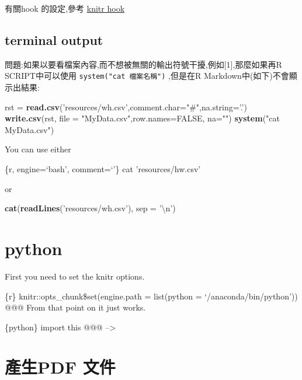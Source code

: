 \documentclass[]{book}
\newenvironment{Shaded}{\begin{snugshade}}{\end{snugshade}}
\newcommand{\KeywordTok}[1]{\textcolor[rgb]{0.13,0.29,0.53}{\textbf{#1}}}
\newcommand{\DataTypeTok}[1]{\textcolor[rgb]{0.13,0.29,0.53}{#1}}
\newcommand{\CharTok}[1]{\textcolor[rgb]{0.31,0.60,0.02}{#1}}
\newcommand{\StringTok}[1]{\textcolor[rgb]{0.31,0.60,0.02}{#1}}
\newcommand{\OtherTok}[1]{\textcolor[rgb]{0.56,0.35,0.01}{#1}}
\newcommand{\NormalTok}[1]{#1}
\theoremstyle{definition}
\theoremstyle{definition}
\theoremstyle{definition}
\theoremstyle{remark}
\begin{document}
有關hook 的設定,參考
\href{https://yihui.name/knitr/hooks/\#output-hooks}{knitr hook}

\subsection{terminal output}\label{terminal-output}

問題:如果以要看檔案內容,而不想被無關的輸出符號干擾,例如{[}1{]},那麼如果再R
SCRIPT中可以使用 \texttt{system("cat\ 檔案名稱")} ,但是在R
Markdown中(如下)不會顯示出結果:

\begin{Shaded}
\begin{Highlighting}[]
\NormalTok{rst =}\StringTok{ }\KeywordTok{read.csv}\NormalTok{(}\StringTok{'resources/wh.csv'}\NormalTok{,}\DataTypeTok{comment.char=}\StringTok{"#"}\NormalTok{,}\DataTypeTok{na.string=}\StringTok{'.'}\NormalTok{)}
\KeywordTok{write.csv}\NormalTok{(rst, }\DataTypeTok{file =} \StringTok{"MyData.csv"}\NormalTok{,}\DataTypeTok{row.names=}\OtherTok{FALSE}\NormalTok{, }\DataTypeTok{na=}\StringTok{""}\NormalTok{)}
\KeywordTok{system}\NormalTok{(}\StringTok{"cat MyData.csv"}\NormalTok{)}
\end{Highlighting}
\end{Shaded}

You can use either

\{r, engine=`bash', comment=`'\} cat 'resources/hw.csv'

or

\begin{Shaded}
\begin{Highlighting}[]
\KeywordTok{cat}\NormalTok{(}\KeywordTok{readLines}\NormalTok{(}\StringTok{'resources/wh.csv'}\NormalTok{), }\DataTypeTok{sep =} \StringTok{'}\CharTok{\textbackslash{}n}\StringTok{'}\NormalTok{)}
\end{Highlighting}
\end{Shaded}

\section{python}\label{python}

First you need to set the knitr options.

\{r\} knitr::opts\_chunk\$set(engine.path = list(python =
`/anaconda/bin/python')) @@@ From that point on it just works.

\{python\} import this @@@ --\textgreater{}

\section{產生PDF 文件}\label{pdf-}
\end{document}
